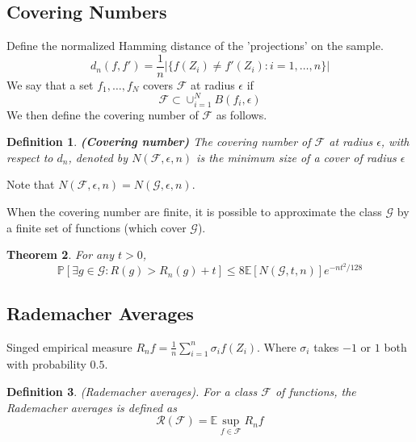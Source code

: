 \documentclass[12pt,reqno]{amsart}
\newtheorem{thm}{Theorem}[section]
\newtheorem{definition}[thm]{Definition}
{ \theoremstyle{remark}\newtheorem*{remark}{Remark} }
\begin{document}
\subsection{Covering Numbers}
Define the normalized Hamming distance of the 'projections' on the sample.
$$
	d_n(f,f') = \frac{1}{n}|\{ f(Z_i) \neq f'(Z_i): i=1,\ldots,n \} |
$$
We say that a set $f_1,\ldots,f_N$ covers $\mathcal{F}$ at radius $\epsilon$ if
$$
	\mathcal{F} \subset \cup_{i=1}^N B(f_i,\epsilon)
$$
We then define the covering number of $\mathcal{F}$ as follows.	

\begin{definition} \textbf{(Covering number)}
The covering number of $\mathcal{F}$ at radius $\epsilon$, with respect to $d_n$, denoted by $N(\mathcal{F},\epsilon, n)$ is the minimum size of a cover of radius $\epsilon$
\end{definition}
Note that $N(\mathcal{F},\epsilon, n) = N(\mathcal{G}, \epsilon, n)$.

When the covering number are finite, it is possible to approximate the class $\mathcal{G}$ by a finite set of functions (which cover $\mathcal{G}$). 
\begin{thm}
	For any $t > 0$,
	$$
	\mathbb{P}[\exists g\in\mathcal{G}: R(g) > R_n(g)+t] \leq 8\mathbb{E}[N(\mathcal{G}, t, n)] e^{-nt^2/128}
	$$
\end{thm}



\subsection{Rademacher Averages}
Singed empirical measure $R_nf=\frac{1}{n}\sum_{i=1}^n\sigma_if(Z_i)$. Where $\sigma_i$ takes $-1$ or $1$ both with probability $0.5$.
 
\begin{definition} (Rademacher averages).
For a class $\mathcal{F}$ of functions, the Rademacher averages is defined as
$$
	\mathcal{R}(\mathcal{F}) = \mathbb{E} \sup_{f\in\mathcal{F}}R_nf
$$
\end{definition}
\end{document}

